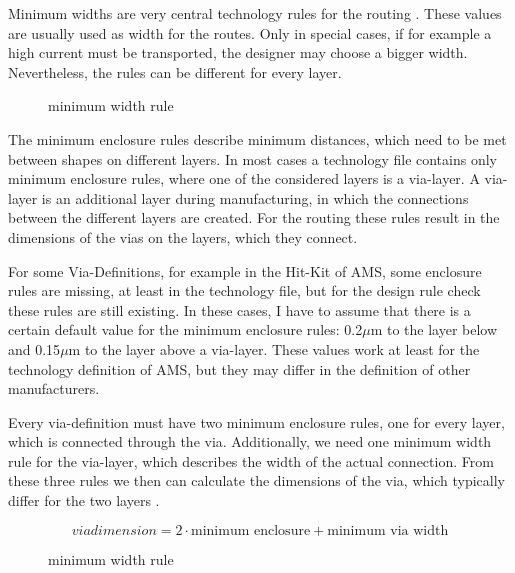 Minimum widths are very central technology rules for the routing . These values are usually used as width for the routes. Only in special cases, if for example a high current must be transported, the designer may choose a bigger width. Nevertheless, the rules can be different for every layer.

\begin{figure}
	\centering
	
	\caption{minimum width rule}
	\label{fig:technology_rule_width}
\end{figure}

The minimum enclosure rules describe minimum distances, which need to be met between shapes on different layers. In most cases a technology file contains only minimum enclosure rules, where one of the considered layers is a via-layer. A via-layer is an additional layer during manufacturing, in which the connections between the different layers are created. For the routing these rules result in the dimensions of the vias on the layers, which they connect.

For some Via-Definitions, for example in the Hit-Kit of AMS, some enclosure rules are missing, at least in the technology file, but for the design rule check these rules are still existing. In these cases, I have to assume that there is a certain default value for the minimum enclosure rules: 0.2$\mu$m to the layer below and 0.15$\mu$m to the layer above a via-layer. These values work at least for the technology definition of AMS, but they may differ in the definition of other manufacturers.

Every via-definition must have two minimum enclosure rules, one for every layer, which is connected through the via. Additionally, we need one minimum width rule for the via-layer, which describes the width of the actual connection. From these three rules we then can calculate the dimensions of the via, which typically differ for the two layers .

\begin{equation}
\label{eq:via_dimension}
{via dimension} = 2 \cdot \text{minimum enclosure} + \text{minimum via width}
\end{equation}

\begin{figure}
	\centering
	
	\caption{minimum width rule}
	\label{fig:technology_rule_via_dimensions}
\end{figure}


